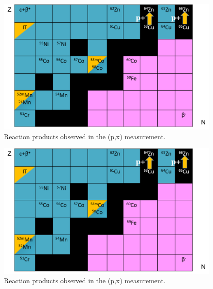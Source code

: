 \begin{figure}
 \centering
 \includegraphics[width=0.75\columnwidth]{./figures/ipf_cu_product_table.png}
 \caption{ Reaction products observed in the (p,x) measurement.}
 \label{fig:fe_cu_product_table}
\end{figure}


\begin{figure}
 \centering
 \includegraphics[width=0.75\columnwidth]{./figures/ipf_cu_product_table.png}
 \caption{ Reaction products observed in the (p,x) measurement.}
 \label{fig:fe_ti_product_table}
\end{figure}






